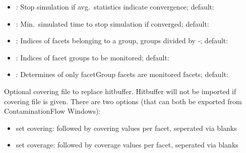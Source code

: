 \begin{itemize}[noitemsep,topsep=0pt, partopsep=0pt]
\item {}: Stop simulation if avg.\ statistics indicate convergence; default: 
\item {}: Min.\ simulated time to stop simulation if converged; default: 
\item {}:  Indices of facets belonging to a group, groups divided by -; default:\codew{[]}
\item {}: Indices of facet groups to be monitored; default:\codew{[]}
\item {}: Determines of only facetGroup facets are monitored facets; default:
\end{itemize}
\bigskip
Optional covering file to replace hitbuffer. Hitbuffer will not be imported if covering file is given. There are two options (that can both be exported from ContaminationFlow Windows):
\begin{itemize}[noitemsep,topsep=0pt, partopsep=0pt]
\item  set covering:  followed by covering values per facet, seperated via blanks
\item  set coverage:  followed by coverage values per facet, seperated via blanks
\end{itemize}
%
%


